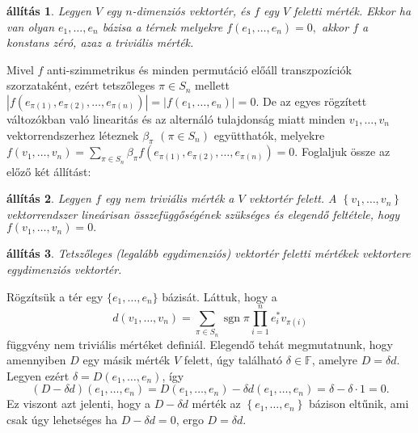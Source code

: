 \documentclass[a4paper, showtrims]{memoir}
\makeatletter
\renewenvironment{proof}[1][\proofname]
    {\par\pushQED{\qed}%
    \normalfont \topsep6\p@\@plus6\p@\relax
    \trivlist
    \item[\hskip\labelsep
        \itshape
    #1\@addpunct{:}]\ignorespaces}
    {\popQED\endtrivlist\@endpefalse}
\theoremstyle{plain}
\newtheorem{proposition}{állítás}[chapter]
\theoremstyle{remark}
\theoremstyle{definition}
\DeclareMathOperator{\sgn}{sgn}
\makeatother
\begin{document}
\begin{proposition}
	Legyen $V$ egy $n$-dimenziós vektortér, és $f$ egy $V$ feletti mérték.
	Ekkor ha van olyan $e_{1},\ldots ,e_{n}$ bázisa a térnek melyekre
	\(
	f\left( e_{1},\ldots ,e_{n}\right)
	=
	0,
	\)
	akkor $f$ a konstans zéró, azaz a triviális mérték.
\end{proposition}
\begin{proof}
	Mivel $f$ anti-szimmetrikus és minden permutáció előáll transzpozíciók szorzataként,
	ezért tetszőleges $\pi \in S_{n}$ mellett
	$\left| f\left(e_{\pi \left( 1\right) },e_{\pi \left( 2\right) },\ldots ,e_{\pi \left(n\right) }\right) \right|
		=
		\left| f\left( e_{1},\ldots ,e_{n}\right) \right|
		=
		0.
	$
	De az egyes rögzített változókban való linearitás és az alternáló tulajdonság miatt minden
	$v_{1},\ldots ,v_{n}$ vektorrendszerhez léteznek
	$\beta _{\pi }$ $\left( \pi \in S_{n}\right) $ együtthatók,
	melyekre
	$f\left(v_{1},\ldots ,v_{n}\right)
		=
		\sum_{\pi \in S_{n}}\beta _{\pi }f\left( e_{\pi\left( 1\right) },e_{\pi \left( 2\right) },\ldots ,e_{\pi \left( n\right)}\right)
		=
		0.$
\end{proof}
Foglaljuk össze az előző két állítást:
\begin{proposition}
	Legyen $f$ egy nem triviális mérték a $V$ vektortér felett. A
	\begin{math}
		\left\{ v_1,\ldots,v_n \right\}
	\end{math}
	vektorrendszer lineárisan összefüggőségének szükséges és elegendő feltétele,
	hogy
	\begin{math}
		f\left( v_1,\ldots,v_n \right)
		=
		0.
	\end{math}
\end{proposition}

\begin{proposition}
	Tetszőleges (legalább egydimenziós) vektortér feletti mértékek vektortere egydimenziós vektortér.
\end{proposition}
\begin{proof}
	Rögzítsük a tér egy $\{e_{1},\ldots ,e_{n}\}$ bázisát.
	Láttuk, hogy a
	\[
		d\left(v_{1},\ldots ,v_{n}\right)
		=
		\sum_{\pi \in S_{n}}\sgn\pi\prod_{i=1}^ne_i^\ast v_{\pi\left( i\right)}
	\]
	függvény nem triviális mértéket definiál.
	Elegendő tehát megmutatnunk,
	hogy amennyiben $D$ egy másik mérték $V$ felett,
	úgy található
	$\delta\in \mathbb{F}$,
	amelyre
	$D=\delta d.$
	Legyen ezért
	$\delta
		=
		D\left( e_{1},\ldots,e_{n}\right)
	$,
	így
	\[
		\left( D-\delta d \right)\left( e_1,\ldots,e_n \right)
		=
		D\left( e_{1},\ldots ,e_{n}\right) -\delta d\left(e_{1},\ldots ,e_{n}\right)
		=
		\delta-\delta\cdot 1
		=
		0.
	\]
	Ez viszont azt jelenti,
	hogy a $D-\delta d$ mérték az  $\left\{e_{1},\ldots ,e_{n}  \right\}$
	bázison eltűnik,
	ami csak úgy lehetséges ha
	$D-\delta d=0$,
	ergo
	\begin{math}
		D=\delta d.
	\end{math}
\end{proof}
\end{document}
